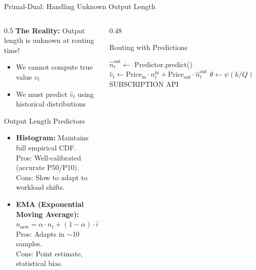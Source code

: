 \documentclass[aspectratio=169,10pt]{beamer}
\begin{document}
\begin{frame}{Primal-Dual: Handling Unknown Output Length}
\begin{columns}[T]
\begin{column}{0.5\textwidth}
\textbf{The Reality:} Output length is unknown at routing time!
\begin{itemize}\setlength{\itemsep}{2pt}
    \item We cannot compute true value $v_t$
    \item We must predict $\hat{v}_t$ using historical distributions
\end{itemize}

\vspace{0.2cm}
\begin{block}{Output Length Predictors}
\small
\begin{itemize}\setlength{\itemsep}{2pt}
    \item \textbf{Histogram:} Maintains full empirical CDF.\\
    \textcolor{icmlgreen}{Pros:} Well-calibrated (accurate P50/P10).\\
    \textcolor{icmlred}{Cons:} Slow to adapt to workload shifts.
    \item \textbf{EMA (Exponential Moving Average):}\\
    $\hat{n}_{\text{new}} = \alpha \cdot n_t + (1-\alpha) \cdot \hat{n}_{\text{old}}$\\
    \textcolor{icmlgreen}{Pros:} Adapts in $\sim$10 samples.\\
    \textcolor{icmlred}{Cons:} Point estimate, statistical bias.
\end{itemize}
\end{block}
\end{column}

\begin{column}{0.48\textwidth}
\begin{exampleblock}{Routing with Predictions}
\small
\begin{algorithmic}[1]
\STATE $\hat{n}_t^{\text{out}} \gets$ Predictor.predict()
\STATE $\hat{v}_t \gets \text{Price}_{\text{in}} \cdot n_t^{\text{in}} + \text{Price}_{\text{out}} \cdot \hat{n}_t^{\text{out}}$
\STATE $\theta \gets \psi(k/Q)$ 
    \RETURN SUBSCRIPTION
\ELSE
    \RETURN API
\ENDIF
\end{algorithmic}
\end{exampleblock}

\vspace{0.2cm}
\end{column}
\end{columns}
\end{frame}
\end{document}
